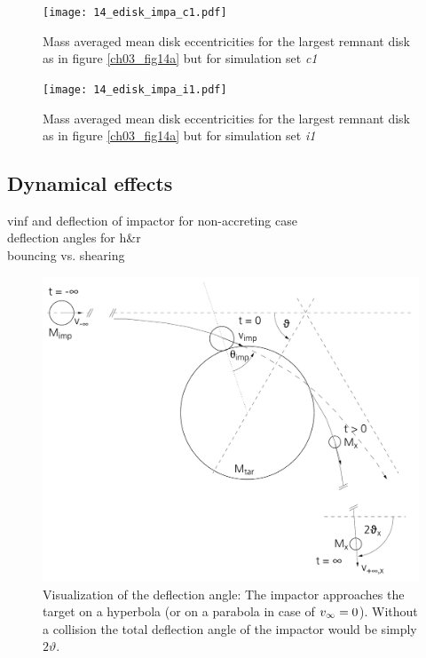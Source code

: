 {\begin{landscape}
\begin{figure}
\begin{center}
\texttt{[image: 14\_edisk\_impa\_c1.pdf]}
\caption{Mass averaged mean disk eccentricities for the largest remnant disk as in figure \ref{ch03_fig14a} but for simulation set \emph{c1}}
\label{ch03_fig14b}
\end{center}
\end{figure}

\begin{figure}
\begin{center}
\texttt{[image: 14\_edisk\_impa\_i1.pdf]}
\caption{Mass averaged mean disk eccentricities for the largest remnant disk as in figure \ref{ch03_fig14a} but for simulation set \emph{i1}}
\label{ch03_fig14c}
\end{center}
\end{figure}
\end{landscape}


\subsection{Dynamical effects}
vinf and deflection of impactor for non-accreting case\\
deflection angles for h\&r \\
bouncing vs. shearing \\

\begin{figure}[htbp]
\begin{center}
\includegraphics[scale=0.5]{04_vartheta}
\caption{Visualization of the deflection angle: The impactor approaches the target on a hyperbola (or on a parabola in case of $v_{\infty} = 0$). Without a collision the total deflection angle of the impactor would be simply $2 \vartheta$.}
\label{ch03_fig02}
\end{center}
\end{figure}

}
